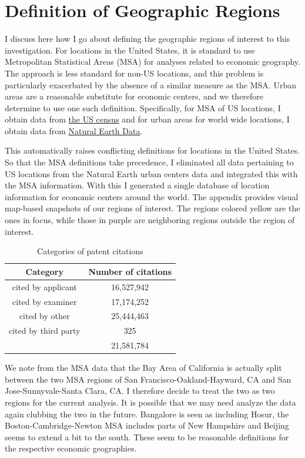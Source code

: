 \documentclass[12pt]{article}
\begin{document}
\section{Definition of Geographic Regions}
I discuss here how I go about defining the geographic regions of interest to this investigation.  For locations in the United States, it is standard to use Metropolitan Statistical Areas (MSA) for analyses related to economic geography. The approach is less standard for non-US locations, and this problem is particularly exacerbated by the absence of a similar measure as the MSA. Urban areas are a reasonable substitute for  economic centers, and we therefore determine to use one such definition. Specifically, for MSA of US locations, I obtain data from \href{http://www.census.gov/geo/maps-data/data/cbf/cbf_msa.html}{the US census} and for urban areas for world wide locations, I obtain data from \href{http://www.naturalearthdata.com/downloads/10m-cultural-vectors/}{Natural Earth Data}.
 
This automatically raises conflicting definitions for locations in the United States. So that the MSA definitions take precedence, I eliminated all data pertaining to US locations from the Natural Earth urban centers data and integrated this with the MSA information. With this I  generated a single database of location information for economic centers around the world. The appendix provides visual map-based snapshots of our regions of interest. The regions colored yellow are the ones in focus, while those in purple are neighboring regions outside the region of interest. 

\begin{table}
\begin{centering}
\begin{tabular}{|c|c|}
\hline
\textbf{Category}&\textbf{Number of citations}\\\hline
cited by applicant&16,527,942\\\hline
cited by examiner&17,174,252\\\hline
cited by other&25,444,463\\\hline
cited by third party&325\\\hline
&21,581,784\\\hline
\end{tabular}
\caption {Categories of patent citations}
\label{table:uspatentcitation}
\end{centering}
\end{table} 

We note from the MSA data that the Bay Area of California is actually split between the two MSA regions of San Francisco-Oakland-Hayward, CA and San Jose-Sunnyvale-Santa Clara, CA. I therefore decide to treat the two as two regions for the current analysis. It is possible that we may need analyze the data again clubbing the two in the future. Bangalore is seen as including Hosur, the Boston-Cambridge-Newton MSA includes parts of New Hampshire and Beijing seems to extend a bit to the south.  These seem to be reasonable definitions for the respective economic geographies. 
\end{document}
